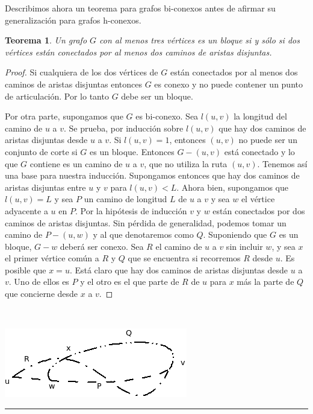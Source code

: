 \documentclass[10pt,a5paper]{book}
\newtheorem{teorema}{Teorema}[chapter]
\begin{document}
Describimos ahora un teorema para grafos bi-conexos antes de afirmar su generalización para grafos h-conexos.

\begin{teorema}
Un grafo $G$ con al menos tres vértices es un bloque si y sólo si dos vértices están conectados por al menos dos caminos de aristas disjuntas.
\end{teorema}
\begin{proof}
Si cualquiera de los dos vértices de $G$ están conectados por al menos dos caminos de aristas disjuntas entonces $G$ es conexo y no puede contener un punto de articulación. Por lo tanto $G$ debe ser un bloque.

Por otra parte, supongamos que $G$ es bi-conexo. Sea $l(u,v)$ la longitud del camino de $u$ a $v$. Se prueba, por inducción sobre $l(u,v)$ que hay dos caminos de aristas disjuntas desde $u$ a $v$. Si $l(u,v) = 1$, entonces $(u,v)$ no puede ser un conjunto de corte si $G$ es un bloque. Entonces $G - (u,v)$ está conectado y lo que $G$ contiene es un camino de $u$ a $v$, que no utiliza la ruta $(u,v)$. Tenemos así una base para nuestra inducción. Supongamos entonces que hay dos caminos de aristas disjuntas entre $u$ y $v$ para $l(u,v) < L$. Ahora bien, supongamos que $l(u,v) = L$ y sea $P$ un camino de longitud $L$ de $u$ a $v$ y sea $w$ el vértice adyacente a $u$ en $P$. Por la hipótesis de inducción $v$ y $w$ están conectados por dos caminos de aristas disjuntas. Sin pérdida de generalidad, podemos tomar un camino de $P - (u,w)$ y al que denotaremos como $Q$. Suponiendo que $G$ es un bloque, $G - w$ deberá ser conexo. Sea $R$ el camino de $u$ a $v$ sin incluir $w$, y sea $x$ el primer vértice común a $R$ y $Q$ que se encuentra si recorremos $R$ desde $u$. Es posible que $x = u$. Está claro que hay dos caminos de aristas disjuntas desde $u$ a $v$. Uno de ellos es $P$ y el otro es el que parte de $R$ de $u$ para $x$ más la parte de $Q$ que concierne desde $x$ a $v$.
\end{proof}

\begin{figure}[H]
\end{figure}
\hrulefill{}\\
\parbox{10cm}
{
  \hspace*{.8in}\includegraphics[scale=.6]{Fig2_12.png}
}\hrule
\hfill
\end{document}
